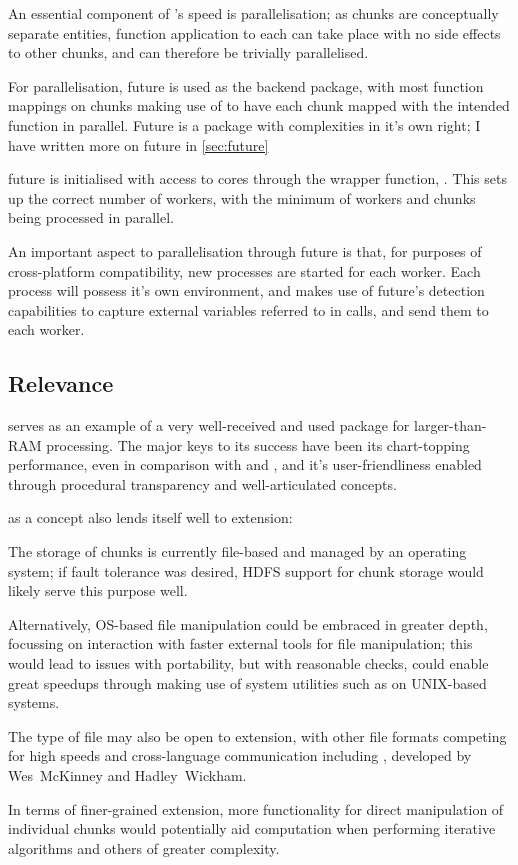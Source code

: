 An essential component of 's speed is parallelisation; as
chunks are conceptually separate entities, function application to each
can take place with no side effects to other chunks, and can therefore
be trivially parallelised.

For parallelisation, future is used as the backend package, with most
function mappings on chunks making use of 
to have each chunk mapped with the intended function in parallel. Future
is a package with complexities in it's own right; I have written more on
future in \cref{sec:future}

future is initialised with access to cores through the wrapper function,
\cite{zj19:_key}.
This sets up the correct number of workers, with the minimum of workers
and chunks being processed in parallel.

An important aspect to parallelisation through future is that, for
purposes of cross-platform compatibility, new \R processes are started
for each worker\cite{zj19:_using}. Each process will possess it's own
environment, and  makes use of future's detection capabilities
to capture external variables referred to in calls, and send them to
each worker.

\subsection{Relevance}\label{sec:relevance}

 serves as an example of a very well-received and used package
for larger-than-RAM processing. The major keys to its success have been
its chart-topping performance, even in comparison with  and ,
and it's user-friendliness enabled through procedural transparency and
well-articulated concepts.

 as a concept also lends itself well to extension:

The storage of chunks is currently file-based and managed by an
operating system; if fault tolerance was desired, HDFS support for chunk
storage would likely serve this purpose well.

Alternatively, OS-based file manipulation could be embraced in greater
depth, focussing on interaction with faster external tools for file
manipulation; this would lead to issues with portability, but with
reasonable checks, could enable great speedups through making use of
system utilities such as  on UNIX-based systems.

The type of file may also be open to extension, with other file formats
competing for high speeds and cross-language communication including , developed by Wes~McKinney and Hadley~Wickham\cite{wes16}.

In terms of finer-grained extension, more functionality for direct
manipulation of individual chunks would potentially aid computation when
performing iterative algorithms and others of greater complexity.
